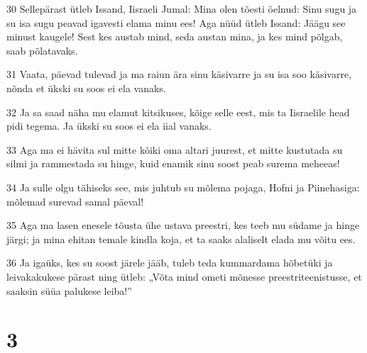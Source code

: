 \par 30 Sellepärast ütleb Issand, Iisraeli Jumal: Mina olen tõesti öelnud: Sinu sugu ja su isa sugu peavad igavesti elama minu ees! Aga nüüd ütleb Issand: Jäägu see minust kaugele! Sest kes austab mind, seda austan mina, ja kes mind põlgab, saab põlatavaks.
\par 31 Vaata, päevad tulevad ja ma raiun ära sinu käsivarre ja su isa soo käsivarre, nõnda et ükski su soos ei ela vanaks.
\par 32 Ja sa saad näha mu elamut kitsikuses, kõige selle eest, mis ta Iisraelile head pidi tegema. Ja ükski su soos ei ela iial vanaks.
\par 33 Aga ma ei hävita sul mitte kõiki oma altari juurest, et mitte kustutada su silmi ja rammestada su hinge, kuid enamik sinu soost peab surema meheeas!
\par 34 Ja sulle olgu tähiseks see, mis juhtub su mõlema pojaga, Hofni ja Piinehasiga: mõlemad surevad samal päeval!
\par 35 Aga ma lasen enesele tõusta ühe ustava preestri, kes teeb mu südame ja hinge järgi; ja mina ehitan temale kindla koja, et ta saaks alaliselt elada mu võitu ees.
\par 36 Ja igaüks, kes su soost järele jääb, tuleb teda kummardama hõbetüki ja leivakakukese pärast ning ütleb: „Võta mind ometi mõnesse preestriteenistusse, et saaksin süüa palukese leiba!”

\chapter{3}


